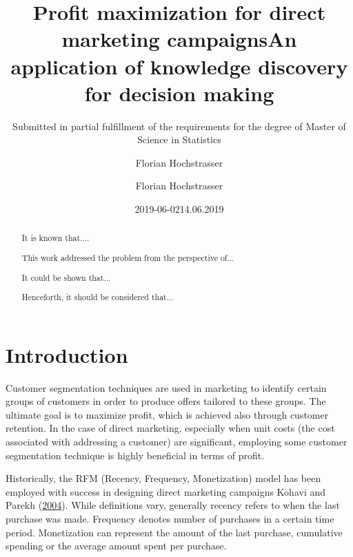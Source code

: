 \documentclass[
  11pt,
  a4paper,
  DIV=12,captions=tableheading,oneside,titlepage=firstiscover,abstracton]{scrreprt}
\title{Profit maximization for direct marketing campaigns}
\author{Florian Hochstrasser}
\date{2019-06-02}
\let\oldmaketitle\maketitle
\begin{document}
\maketitle

\begin{titlepage}

\titlehead{Master Thesis}
\subject{Profit maximisation for direct marketing campaigns}
\title{An application of knowledge discovery for decision making}
\subtitle{Submitted in partial fulfillment of the requirements for the degree of Master of Science in Statistics}
\author{Florian Hochstrasser}
\date{14.06.2019}
\publishers{Supervisor: Jacques Zuber}

\end{titlepage}

\let\maketitle\oldmaketitle
\maketitle

\begin{abstract}

It is known that....

This work addressed the problem from the perspective of...

It could be shown that...

Henceforth, it should be considered that...
\end{abstract}

{
\setcounter{tocdepth}{2}
\tableofcontents
}
\hypertarget{intro}{%
\chapter{Introduction}\label{intro}}

Customer segmentation techniques are used in marketing to identify certain groups of customers in order to produce offers tailored to these groups. The ultimate goal is to maximize profit, which is achieved also through customer retention. In the case of direct marketing, especially when unit costs (the cost associated with addressing a customer) are significant, employing some customer segmentation technique is highly beneficial in terms of profit.

Historically, the RFM (Recency, Frequency, Monetization) model has been employed with success in designing direct marketing campaigns Kohavi and Parekh (\protect\hyperlink{ref-kohavi2004visualizing}{2004}). While definitions vary, generally recency refers to when the last purchase was made. Frequency denotes number of purchases in a certain time period. Monetization can represent the amount of the last purchase, cumulative spending or the average amount spent per purchase.
\end{document}
